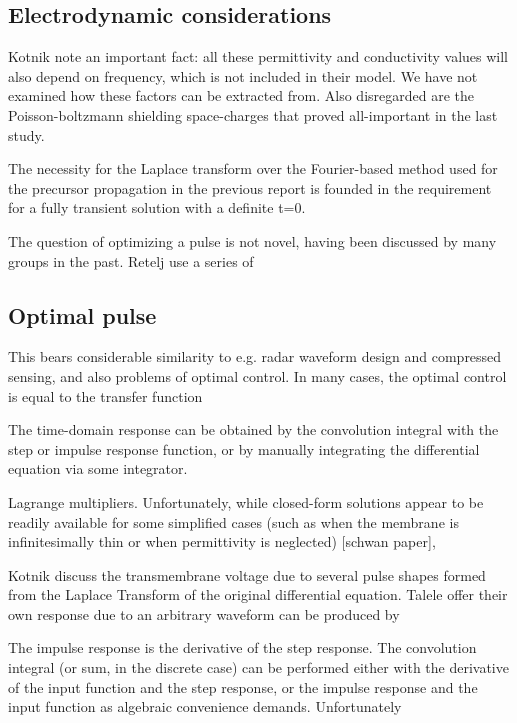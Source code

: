 \documentclass[fleqn,10pt]{paper}
\begin{document}

\subsection{Electrodynamic considerations}

Kotnik note an important fact: all these permittivity and conductivity values will also depend on frequency, which is not included in their model. We have not examined how these factors can be extracted from. Also disregarded are the Poisson-boltzmann shielding space-charges that proved all-important in the last study. 

The necessity for the Laplace transform over the Fourier-based method used for the precursor propagation in the previous report is founded in the requirement for a fully transient solution with a definite t=0.

The question of optimizing a pulse is not novel, having been discussed by many groups in the past. Retelj use a series of 

\subsection{Optimal pulse}

This bears considerable similarity to e.g. radar waveform design and compressed sensing, and also problems of optimal control. In many cases, the optimal control is equal to the transfer function

The time-domain response can be obtained by the convolution integral with the step or impulse response function, or by manually integrating the differential equation via some integrator.

Lagrange multipliers. Unfortunately, while closed-form solutions appear to be readily available for some simplified cases (such as when the membrane is infinitesimally thin or when permittivity is neglected) [schwan paper], 

Kotnik discuss the transmembrane voltage due to several pulse shapes formed from the Laplace Transform of the original differential equation. Talele offer their own response due to an arbitrary waveform can be produced by 

The impulse response is the derivative of the step response. The convolution integral (or sum, in the discrete case) can be performed either with the derivative of the input function and the step response, or the impulse response and the input function as algebraic convenience demands. Unfortunately
\end{document}
